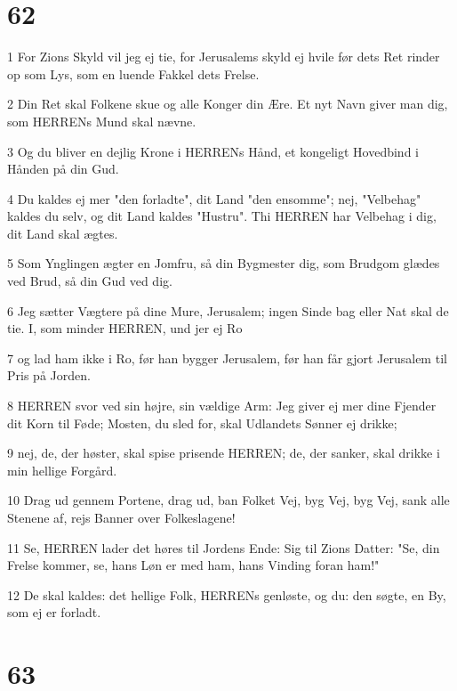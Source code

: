 \chapter{62}

\par 1 For Zions Skyld vil jeg ej tie, for Jerusalems skyld ej hvile før dets Ret rinder op som Lys, som en luende Fakkel dets Frelse.
\par 2 Din Ret skal Folkene skue og alle Konger din Ære. Et nyt Navn giver man dig, som HERRENs Mund skal nævne.
\par 3 Og du bliver en dejlig Krone i HERRENs Hånd, et kongeligt Hovedbind i Hånden på din Gud.
\par 4 Du kaldes ej mer "den forladte", dit Land "den ensomme"; nej, "Velbehag" kaldes du selv, og dit Land kaldes "Hustru". Thi HERREN har Velbehag i dig, dit Land skal ægtes.
\par 5 Som Ynglingen ægter en Jomfru, så din Bygmester dig, som Brudgom glædes ved Brud, så din Gud ved dig.
\par 6 Jeg sætter Vægtere på dine Mure, Jerusalem; ingen Sinde bag eller Nat skal de tie. I, som minder HERREN, und jer ej Ro
\par 7 og lad ham ikke i Ro, før han bygger Jerusalem, før han får gjort Jerusalem til Pris på Jorden.
\par 8 HERREN svor ved sin højre, sin vældige Arm: Jeg giver ej mer dine Fjender dit Korn til Føde; Mosten, du sled for, skal Udlandets Sønner ej drikke;
\par 9 nej, de, der høster, skal spise prisende HERREN; de, der sanker, skal drikke i min hellige Forgård.
\par 10 Drag ud gennem Portene, drag ud, ban Folket Vej, byg Vej, byg Vej, sank alle Stenene af, rejs Banner over Folkeslagene!
\par 11 Se, HERREN lader det høres til Jordens Ende: Sig til Zions Datter: "Se, din Frelse kommer, se, hans Løn er med ham, hans Vinding foran ham!"
\par 12 De skal kaldes: det hellige Folk, HERRENs genløste, og du: den søgte, en By, som ej er forladt.

\chapter{63}

